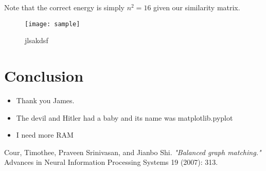 \documentclass[10pt,twocolumn]{article}
\begin{document}
Note that the correct energy is simply $n^2=16$ given our similarity matrix.
\begin{figure}[t]
    \centering
    \texttt{[image: sample]}
    \caption{jlsakdsf}
\end{figure}

\section{Conclusion}

\begin{itemize}

  \item Thank you James.
  \item The devil and Hitler had a baby and its name was matplotlib.pyplot
  \item I need more RAM
\end{itemize}

\begin{thebibliography}{9}
  Cour, Timothee, Praveen Srinivasan, and Jianbo Shi.
  \emph{"Balanced graph matching."}
  Advances in Neural Information Processing Systems 19 (2007): 313.
\end{thebibliography}
\end{document}
